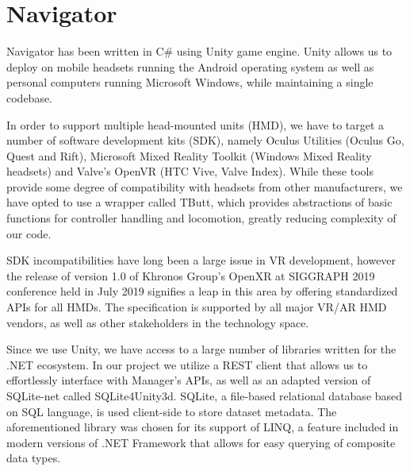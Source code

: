 \documentclass[thesis=M,english,hidelinks]{FITthesisXE}[2012/06/26]
\begin{document}
\newpage

\section{Navigator}

Navigator has been written in C\# using Unity game engine.\autocite{unity} Unity allows us to deploy on mobile headsets running the Android operating system as well as personal computers running Microsoft Windows, while maintaining a single codebase.

In order to support multiple head-mounted units (HMD), we have to target a number of software development kits (SDK), namely Oculus Utilities (Oculus Go, Quest and Rift)\autocite{oculusunity}, Microsoft Mixed Reality Toolkit (Windows Mixed Reality headsets)\autocite{mrtk} and Valve's OpenVR (HTC Vive, Valve Index).\autocite{openvr} While these tools provide some degree of compatibility with headsets from other manufacturers, we have opted to use a wrapper called TButt, which provides abstractions of basic functions for controller handling and locomotion, greatly reducing complexity of our code.\autocite{tbutt}

SDK incompatibilities have long been a large issue in VR development, however the release of version 1.0 of Khronos Group's OpenXR at SIGGRAPH 2019 conference held in July 2019 signifies a leap in this area by offering standardized APIs for all HMDs. The specification is supported by all major VR/AR HMD vendors, as well as other stakeholders in the technology space.\autocite{openxr}

Since we use Unity, we have access to a large number of libraries written for the .NET ecosystem. In our project we utilize a REST client\autocite{restclient} that allows us to effortlessly interface with Manager's APIs, as well as an adapted version of SQLite-net called SQLite4Unity3d.\autocite{sqliteunity} SQLite, a file-based relational database based on SQL language, is used client-side to store dataset metadata.\autocite{sqlite} The aforementioned library was chosen for its support of LINQ, a feature included in modern versions of .NET Framework that allows for easy querying of composite data types.\autocite{linq}
\end{document}
